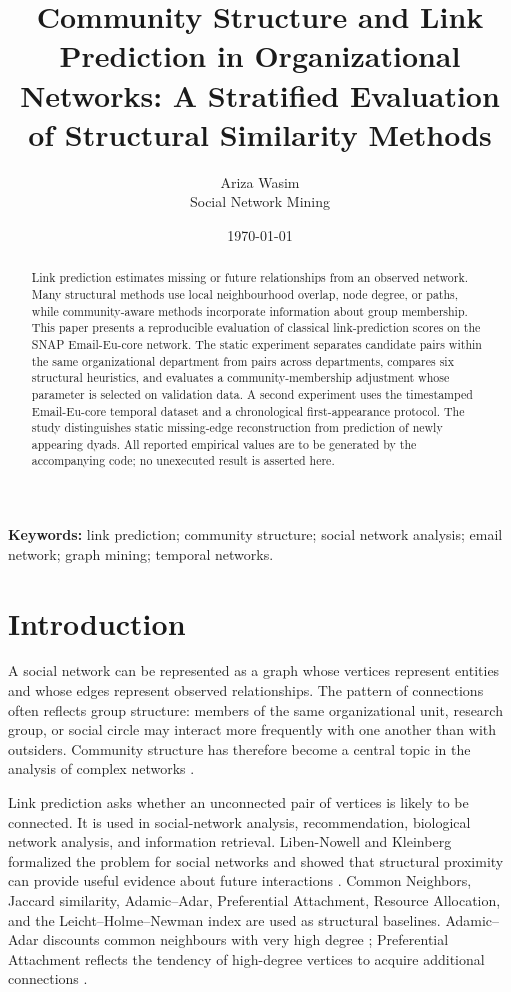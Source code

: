 \documentclass[11pt,a4paper]{article}
\title{Community Structure and Link Prediction in Organizational Networks: A Stratified Evaluation of Structural Similarity Methods}
\author{Ariza Wasim\\Social Network Mining}
\date{\today}
\begin{document}
\maketitle

\begin{abstract}
Link prediction estimates missing or future relationships from an observed network. Many structural methods use local neighbourhood overlap, node degree, or paths, while community-aware methods incorporate information about group membership. This paper presents a reproducible evaluation of classical link-prediction scores on the SNAP Email-Eu-core network. The static experiment separates candidate pairs within the same organizational department from pairs across departments, compares six structural heuristics, and evaluates a community-membership adjustment whose parameter is selected on validation data. A second experiment uses the timestamped Email-Eu-core temporal dataset and a chronological first-appearance protocol. The study distinguishes static missing-edge reconstruction from prediction of newly appearing dyads. All reported empirical values are to be generated by the accompanying code; no unexecuted result is asserted here.
\end{abstract}

\noindent\textbf{Keywords:} link prediction; community structure; social network analysis; email network; graph mining; temporal networks.

\section{Introduction}
A social network can be represented as a graph whose vertices represent entities and whose edges represent observed relationships. The pattern of connections often reflects group structure: members of the same organizational unit, research group, or social circle may interact more frequently with one another than with outsiders. Community structure has therefore become a central topic in the analysis of complex networks \citep{girvan2002community,newman2004finding,newman2006modularity,fortunato2010community}.

Link prediction asks whether an unconnected pair of vertices is likely to be connected. It is used in social-network analysis, recommendation, biological network analysis, and information retrieval. Liben-Nowell and Kleinberg formalized the problem for social networks and showed that structural proximity can provide useful evidence about future interactions \citep{liben2007link}. Common Neighbors, Jaccard similarity, Adamic--Adar, Preferential Attachment, Resource Allocation, and the Leicht--Holme--Newman index are used as structural baselines. Adamic--Adar discounts common neighbours with very high degree \citep{adamic2003friends}; Preferential Attachment reflects the tendency of high-degree vertices to acquire additional connections \citep{barabasi1999emergence}.
\end{document}
